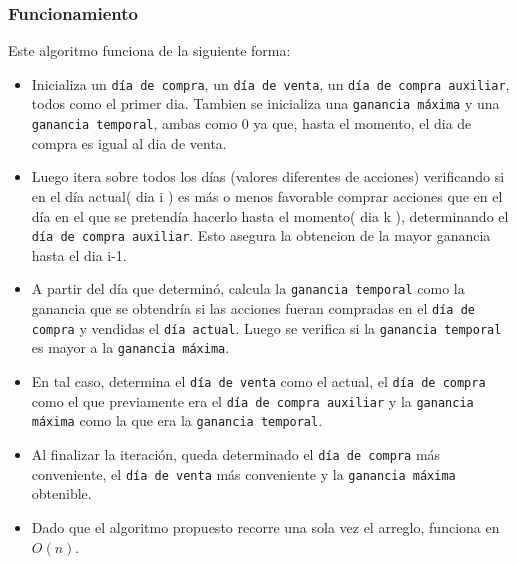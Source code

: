 \documentclass[a4paper, 10pt]{article}
\def\code#1{\texttt{#1}}
\newcommand\tab[1][0.5cm]{\hspace*{#1}}
\begin{document}
             \subsubsection{Funcionamiento}
              \tab Este algoritmo funciona de la siguiente forma:
              \begin{itemize}
                \item Inicializa un \code{día de compra}, un \code{día de venta}, un \code{día de compra auxiliar}, todos
                  como el primer dia. Tambien se inicializa una \code{ganancia máxima} y una \code{ganancia temporal},
                  ambas como 0 ya que, hasta el momento, el dia de compra es igual al dia de venta.

                \item Luego itera sobre todos los días (valores diferentes de acciones) verificando si
                  en el día actual( dia i ) es más o menos favorable comprar acciones que en el día en el
                  que se pretendía hacerlo hasta el momento( dia k ), determinando el \code{día de compra auxiliar}.
                  Esto asegura la obtencion de la mayor ganancia hasta el dia i-1.

                \item A partir del día que determinó, calcula la \code{ganancia temporal} como la ganancia que se obtendría
                  si las acciones fueran compradas en el \code{día de compra} y vendidas el \code{día actual}.
                  Luego se verifica si la \code{ganancia temporal} es mayor a la \code{ganancia máxima}.

                \item En tal caso, determina el \code{día de venta} como el actual, el \code{día de compra}
                  como el que previamente era el \code{día de compra auxiliar} y la \code{ganancia máxima} como
                  la que era la \code{ganancia temporal}.

                \item Al finalizar la iteración, queda determinado el \code{día de compra} más conveniente, el
                  \code{día de venta} más conveniente y la \code{ganancia máxima} obtenible.

                \item Dado que el algoritmo propuesto recorre una sola vez el arreglo, funciona en $O(n)$.
              \end{itemize}
\end{document}
